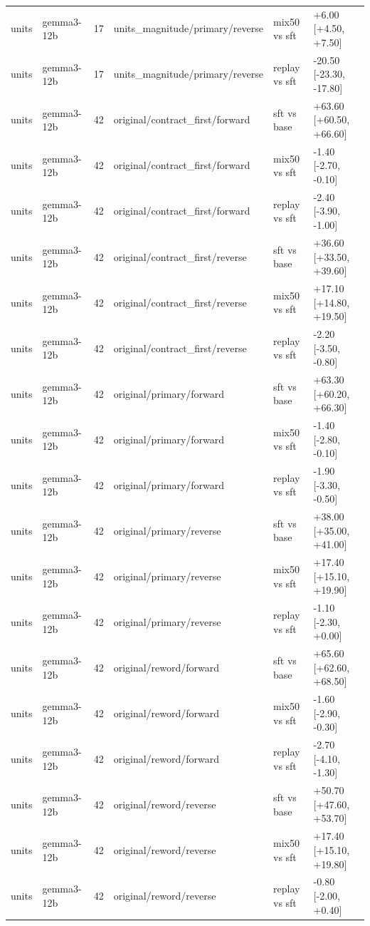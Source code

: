 \begin{table}[t]
\begin{tabular}{llllll}
units & gemma3-12b & 17 & units\_magnitude/primary/reverse & mix50 vs sft & +6.00 [+4.50, +7.50] \\
units & gemma3-12b & 17 & units\_magnitude/primary/reverse & replay vs sft & -20.50 [-23.30, -17.80] \\
units & gemma3-12b & 42 & original/contract\_first/forward & sft vs base & +63.60 [+60.50, +66.60] \\
units & gemma3-12b & 42 & original/contract\_first/forward & mix50 vs sft & -1.40 [-2.70, -0.10] \\
units & gemma3-12b & 42 & original/contract\_first/forward & replay vs sft & -2.40 [-3.90, -1.00] \\
units & gemma3-12b & 42 & original/contract\_first/reverse & sft vs base & +36.60 [+33.50, +39.60] \\
units & gemma3-12b & 42 & original/contract\_first/reverse & mix50 vs sft & +17.10 [+14.80, +19.50] \\
units & gemma3-12b & 42 & original/contract\_first/reverse & replay vs sft & -2.20 [-3.50, -0.80] \\
units & gemma3-12b & 42 & original/primary/forward & sft vs base & +63.30 [+60.20, +66.30] \\
units & gemma3-12b & 42 & original/primary/forward & mix50 vs sft & -1.40 [-2.80, -0.10] \\
units & gemma3-12b & 42 & original/primary/forward & replay vs sft & -1.90 [-3.30, -0.50] \\
units & gemma3-12b & 42 & original/primary/reverse & sft vs base & +38.00 [+35.00, +41.00] \\
units & gemma3-12b & 42 & original/primary/reverse & mix50 vs sft & +17.40 [+15.10, +19.90] \\
units & gemma3-12b & 42 & original/primary/reverse & replay vs sft & -1.10 [-2.30, +0.00] \\
units & gemma3-12b & 42 & original/reword/forward & sft vs base & +65.60 [+62.60, +68.50] \\
units & gemma3-12b & 42 & original/reword/forward & mix50 vs sft & -1.60 [-2.90, -0.30] \\
units & gemma3-12b & 42 & original/reword/forward & replay vs sft & -2.70 [-4.10, -1.30] \\
units & gemma3-12b & 42 & original/reword/reverse & sft vs base & +50.70 [+47.60, +53.70] \\
units & gemma3-12b & 42 & original/reword/reverse & mix50 vs sft & +17.40 [+15.10, +19.80] \\
units & gemma3-12b & 42 & original/reword/reverse & replay vs sft & -0.80 [-2.00, +0.40] \\

\end{tabular}
\end{table}
